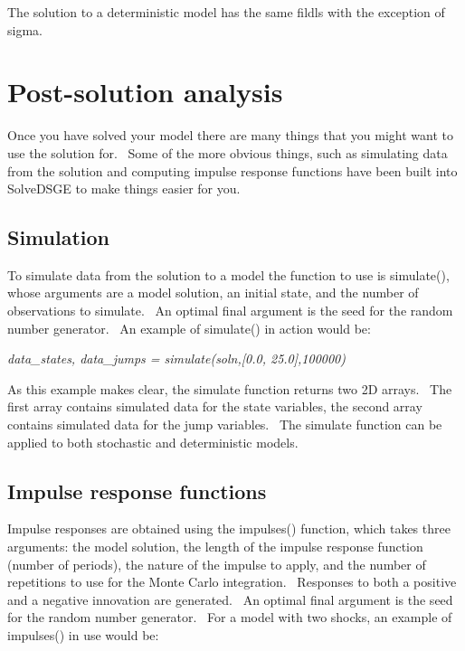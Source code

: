 \documentclass[notitlepage,11pt]{article}
\begin{document}
The solution to a deterministic model has the same fildls with the exception
of sigma.

\section{Post-solution analysis}

Once you have solved your model there are many things that you might want to
use the solution for. \ Some of the more obvious things, such as simulating
data from the solution and computing impulse response functions have been
built into SolveDSGE to make things easier for you.

\subsection{Simulation}

To simulate data from the solution to a model the function to use is
simulate(), whose arguments are a model solution, an initial state, and the
number of observations to simulate. \ An optimal final argument is the seed
for the random number generator. \ An example of simulate() in action would
be:

\bigskip

\textit{data\_states, data\_jumps = simulate(soln,[0.0, 25.0],100000)}

\bigskip

As this example makes clear, the simulate function returns two 2D arrays. \
The first array contains simulated data for the state variables, the second
array contains simulated data for the jump variables. \ The simulate
function can be applied to both stochastic and deterministic models.

\subsection{Impulse response functions}

Impulse responses are obtained using the impulses() function, which takes
three arguments: the model solution, the length of the impulse response
function (number of periods), the nature of the impulse to apply, and the
number of repetitions to use for the Monte Carlo integration. \ Responses to
both a positive and a negative innovation are generated. \ An optimal final
argument is the seed for the random number generator. \ For a model with two
shocks, an example of impulses() in use would be:

\bigskip
\end{document}
